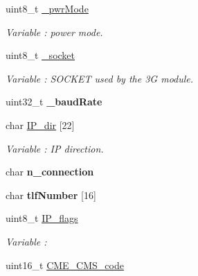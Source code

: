\begin{DoxyCompactItemize}
\item 
uint8\+\_\+t \hyperlink{class_wasp3_g_a1872bb6a43365fd78696bf3e037dfc2e}{\+\_\+pwr\+Mode}
\begin{DoxyCompactList}\small\item\em Variable \+: power mode. \end{DoxyCompactList}\item 
uint8\+\_\+t \hyperlink{class_wasp3_g_a17d8657afaf937e996834b34735066fc}{\+\_\+socket}
\begin{DoxyCompactList}\small\item\em Variable \+: S\+O\+C\+K\+ET used by the 3G module. \end{DoxyCompactList}\item 
uint32\+\_\+t {\bfseries \+\_\+baud\+Rate}\hypertarget{class_wasp3_g_ad01dd5b2de4adab55b9c4af1ffe636a4}{}\label{class_wasp3_g_ad01dd5b2de4adab55b9c4af1ffe636a4}

\item 
char \hyperlink{class_wasp3_g_a5694580cfb9e15f8ea88ecbd282ba8fc}{I\+P\+\_\+dir} \mbox{[}22\mbox{]}\hypertarget{class_wasp3_g_a5694580cfb9e15f8ea88ecbd282ba8fc}{}\label{class_wasp3_g_a5694580cfb9e15f8ea88ecbd282ba8fc}

\begin{DoxyCompactList}\small\item\em Variable \+: IP direction. \end{DoxyCompactList}\item 
char {\bfseries n\+\_\+connection}\hypertarget{class_wasp3_g_adf366d670b8a4078ed965c1b74a3e2e6}{}\label{class_wasp3_g_adf366d670b8a4078ed965c1b74a3e2e6}

\item 
char {\bfseries tlf\+Number} \mbox{[}16\mbox{]}\hypertarget{class_wasp3_g_a7ef7e8a7eaf0c4ff1bc06e45cb3a0610}{}\label{class_wasp3_g_a7ef7e8a7eaf0c4ff1bc06e45cb3a0610}

\item 
uint8\+\_\+t \hyperlink{class_wasp3_g_a00c6706ec6556fa6f4e4add6d5a549cc}{I\+P\+\_\+flags}
\begin{DoxyCompactList}\small\item\em Variable \+: \end{DoxyCompactList}\item 
uint16\+\_\+t \hyperlink{class_wasp3_g_ae158591486ace67554070543af239ebf}{C\+M\+E\+\_\+\+C\+M\+S\+\_\+code}\hypertarget{class_wasp3_g_ae158591486ace67554070543af239ebf}{}\label{class_wasp3_g_ae158591486ace67554070543af239ebf}


\end{DoxyCompactItemize}
